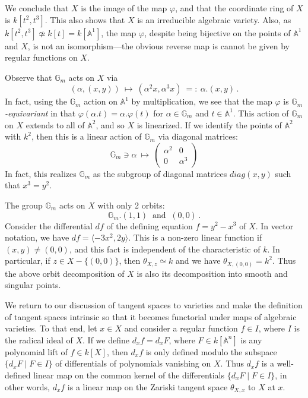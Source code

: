\documentclass[12pt]{amsart}
\begin{document}
We conclude that $X$ is the image of the map $\varphi$, and that the
coordinate ring of $X$ is $k[t^2,t^3]$.
This also shows that $X$ is an irreducible algebraic variety.
Also, as $k[t^2,t^3]\not\simeq k[t]=k[{\mathbb A}^1]$, the map $\varphi$,
despite being bijective on the points of ${\mathbb A}^1$ and $X$, is not an
isomorphism---the obvious reverse map is cannot be given by regular
functions on $X$.

Observe that ${\mathbb G}_m$ acts on $X$ via
$$
   (\alpha,(x,y))\ \longmapsto\ 
   (\alpha^2x,\alpha^3x)\ =:\ \alpha.(x,y)\,.
$$
In fact, using the ${\mathbb G}_m$ action on ${\mathbb A}^1$ by
multiplication, we see that the map $\varphi$ is 
{\sl ${\mathbb G}_m$-equivariant} in that 
$\varphi(\alpha.t)=\alpha.\varphi(t)$ for $\alpha\in{\mathbb G}_m$ and 
$t\in{\mathbb A}^1$.
This action of ${\mathbb G}_m$ on $X$ extends to all of ${\mathbb A}^2$, and
so $X$ is linearized.
If we identify the points of ${\mathbb A}^2$ with $k^2$, then this is a
linear action of ${\mathbb G}_m$ via diagonal matrices:
$$
   {\mathbb G}_m\ni\alpha\ \longmapsto\ 
   \left(\begin{array}{cc}\alpha^2&0\\0&\alpha^3\end{array}\right)
$$
In fact, this realizes ${\mathbb G}_m$ as the subgroup of diagonal matrices
$diag(x,y)$ such that $x^3=y^2$.

The group ${\mathbb G}_m$ acts on $X$ with only 2 orbits:
$$
  {\mathbb G}_m.(1,1)\ \mbox{ and }\ (0,0)\,.
$$
Consider the differential $df$ of the defining equation $f=y^2-x^3$ of $X$.
In vector notation, we have
$df=\langle -3x^2, 2y \rangle$.
This is a non-zero linear function if $(x,y)\neq (0,0)$, and this fact is
independent of the characteristic of $k$.
In particular, if $z\in X-\{(0,0)\}$, then $\theta_{X,z}\simeq k$ and 
we have $\theta_{X,(0,0)}=k^2$.
Thus the above orbit decomposition of $X$ is also its decomposition into
smooth and singular points.
\medskip


We return to our discussion of tangent spaces to varieties and 
make the definition of tangent spaces intrinsic so
that it becomes functorial under maps of algebraic varieties.
To that end, let $x\in X$ and consider a regular function $f\in I$, where
$I$ is the radical ideal of $X$.
If we define $d_xf=d_xF$, where $F\in k[{\mathbb A}^n]$ is any polynomial
lift of $f\in k[X]$, then $d_xf$ is only defined modulo the subspace
$\{d_xF\mid F\in I\}$ of differentials of polynomials vanishing on $X$.
Thus $d_xf$ is a well-defined linear map on the common kernel of the
differentials $\{d_xF\mid F\in I\}$, in other words, 
$d_xf$ is a linear map on the Zariski tangent space $\theta_{X,x}$ 
to $X$ at $x$.
\end{document}
